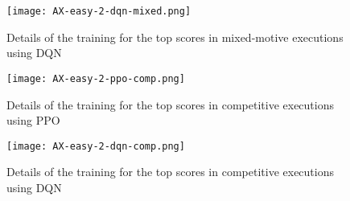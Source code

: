 \begin{figure}[hpbt]
    \centering
    \texttt{[image: AX-easy-2-dqn-mixed.png]}\\
    \caption[Training Details of Top DQN Mixed-Motive Executions]{Details of the training for the top scores in mixed-motive executions using DQN}\label{fig:ax-easy-2-dqn-mixed}
\end{figure}

\begin{figure}[hpbt]
    \centering
    \texttt{[image: AX-easy-2-ppo-comp.png]}\\
    \caption[Training Details of Top PPO Competitive Executions]{Details of the training for the top scores in competitive executions using PPO}\label{fig:ax-easy-2-ppo-comp}
\end{figure}

\begin{figure}[hpbt]
    \centering
    \texttt{[image: AX-easy-2-dqn-comp.png]}\\
    \caption[Training Details of Top DQN Competitive Executions]{Details of the training for the top scores in competitive executions using DQN}\label{fig:ax-easy-2-dqn-comp}
\end{figure}

